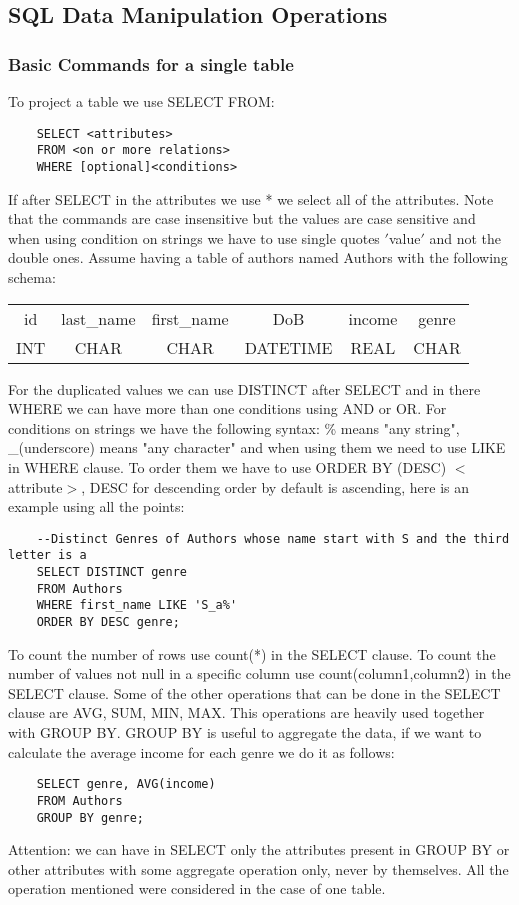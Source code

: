 \documentclass[a4page, 11pt]{article}
\begin{document}
\subsection{SQL Data Manipulation Operations}

\subsubsection{Basic Commands for a single table}
To project a table we use SELECT FROM:

\begin{lstlisting}
	SELECT <attributes>
	FROM <on or more relations>
	WHERE [optional]<conditions>
\end{lstlisting}

If after SELECT in the attributes we use * we select all of the attributes. Note that the commands are case insensitive but the values are case sensitive and when using condition on strings we have to use single quotes $'$value$'$ and not the double ones.\newline
Assume having a table of authors named Authors with the following schema:
\begin{table}[h]
	\centering
	\begin{tabular}{c c c c c c}
		id & last\_name & first\_name & DoB & income & genre\\
		INT & CHAR & CHAR & DATETIME & REAL & CHAR\\
	\end{tabular}
\end{table}


For the duplicated values we can use DISTINCT after SELECT and in there WHERE we can have more than one conditions using AND or OR.\newline
For conditions on strings we have the following syntax: \% means "any string", \_(underscore) means "any character" and when using them we need to use LIKE in WHERE clause. To order them we have to use ORDER BY (DESC) $<$attribute$>$, DESC for descending order by default is ascending, here is an example using all the points:
\pagebreak
\begin{lstlisting}
	--Distinct Genres of Authors whose name start with S and the third letter is a
	SELECT DISTINCT genre
	FROM Authors
	WHERE first_name LIKE 'S_a%'
	ORDER BY DESC genre;
\end{lstlisting}

To count the number of rows use count(*) in the SELECT clause. To count the number of values not null in a specific column use count(column1,column2) in the SELECT clause. Some of the other operations that can be done in the SELECT clause are AVG, SUM, MIN, MAX.\newline
This operations are heavily used together with GROUP BY. GROUP BY  is useful to aggregate the data, if we want to calculate the average income for each genre we do it as follows:
\begin{lstlisting}
	SELECT genre, AVG(income)
	FROM Authors
	GROUP BY genre;
\end{lstlisting}
Attention: we can have in SELECT only the attributes present in GROUP BY or other attributes with some aggregate operation only, never by themselves. All the operation mentioned were considered in the case of one table.
\end{document}
